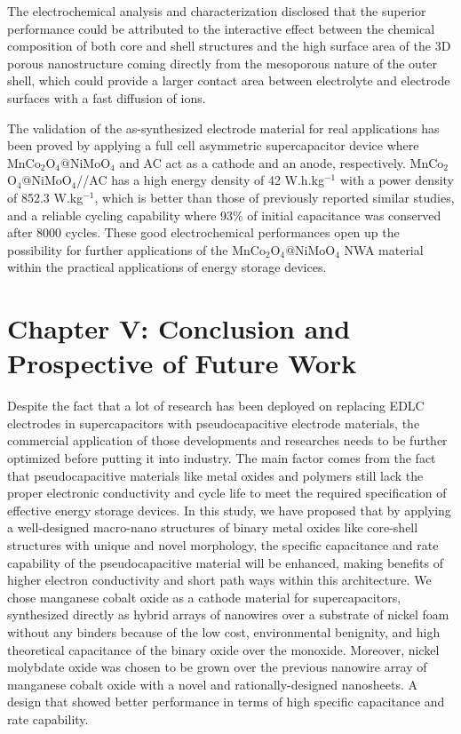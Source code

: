 \documentclass[reprint,amsmath,amssymb,aps,floatfix,
]{revtex4-2}
\begin{document}
The electrochemical analysis and characterization disclosed that the superior performance could be attributed to the interactive effect between the chemical composition of both core and shell structures and the high surface area of the 3D porous nanostructure coming directly from the mesoporous nature of the outer shell, which could provide a larger contact area between electrolyte and electrode surfaces with a fast diffusion of ions.

The validation of the as-synthesized electrode material for real applications has been proved by applying a full cell asymmetric supercapacitor device where MnCo$_2$O$_4$@NiMoO$_4$ and AC act as a cathode and an anode, respectively. MnCo$_2$O$_4$@NiMoO$_4$//AC has a high energy density of 42 W.h.kg$^{-1}$ with a power density of 852.3 W.kg$^{-1}$, which is better than those of previously reported similar studies, and a reliable cycling capability where 93\% of initial capacitance was conserved after 8000 cycles. These good electrochemical performances open up the possibility for further applications of the MnCo$_2$O$_4$@NiMoO$_4$ NWA material within the practical applications of energy storage devices.
\section*{\label{sec:level1}C\lowercase{hapter} V: C\lowercase{onclusion and} P\lowercase{rospective of} F\lowercase{uture} W\lowercase{ork}}
Despite the fact that a lot of research has been deployed on replacing EDLC electrodes in supercapacitors with pseudocapacitive electrode materials, the commercial application of those developments and researches needs to be further optimized before putting it into industry. The main factor comes from the fact that pseudocapacitive materials like metal oxides and polymers still lack the proper electronic conductivity and cycle life to meet the required specification of effective energy storage devices. In this study, we have proposed that by applying a well-designed macro-nano structures of binary metal oxides like core-shell structures with unique and novel morphology, the specific capacitance and rate capability of the pseudocapacitive material will be enhanced, making benefits of higher electron conductivity and short path ways within this architecture. We chose manganese cobalt oxide as a cathode material for supercapacitors, synthesized directly as hybrid arrays of nanowires over a substrate of nickel foam without any binders because of the low cost, environmental benignity, and high theoretical capacitance of the binary oxide over the monoxide. Moreover, nickel molybdate oxide was chosen to be grown over the previous nanowire array of manganese cobalt oxide with a novel and rationally-designed nanosheets. A design that showed better performance in terms of high specific capacitance and rate capability.
\end{document}

